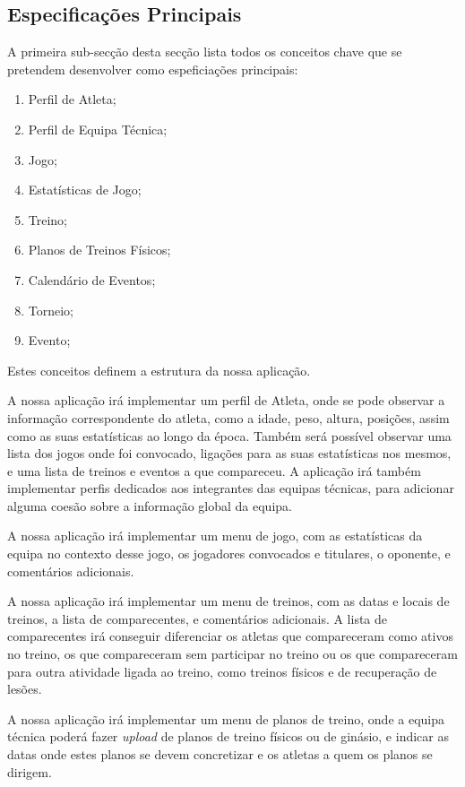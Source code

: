 \subsection{Especificações Principais} \label{sec221}
A primeira sub-secção desta secção lista todos os conceitos chave que se pretendem desenvolver como espeficiações principais:
\begin{enumerate}
	\item Perfil de Atleta;
	\item Perfil de Equipa Técnica;
	\item Jogo;
	\item Estatísticas de Jogo;
	\item Treino;
	\item Planos de Treinos Físicos;
	\item Calendário de Eventos;
	\item Torneio;
	\item Evento;
\end{enumerate}

Estes conceitos definem a estrutura da nossa aplicação. 

A nossa aplicação irá implementar um perfil de Atleta, onde se pode observar a informação correspondente do atleta, como a idade, peso, altura, posições, assim como as suas estatísticas ao longo da época. Também será possível observar uma lista dos jogos onde foi convocado, ligações para as suas estatísticas nos mesmos, e uma lista de treinos e eventos a que compareceu. A aplicação irá também implementar perfis dedicados aos integrantes das equipas técnicas, para adicionar alguma coesão sobre a informação global da equipa.

A nossa aplicação irá implementar um menu de jogo, com as estatísticas da equipa no contexto desse jogo, os jogadores convocados e titulares, o oponente, e comentários adicionais.

A nossa aplicação irá implementar um menu de treinos, com as datas e locais de treinos, a lista de comparecentes, e comentários adicionais. A lista de comparecentes irá conseguir diferenciar os atletas que compareceram como ativos no treino, os que compareceram sem participar no treino ou os que compareceram para outra atividade ligada ao treino, como treinos físicos e de recuperação de lesões.

A nossa aplicação irá implementar um menu de planos de treino, onde a equipa técnica poderá fazer \emph{upload} de planos de treino físicos ou de ginásio, e indicar as datas onde estes planos se devem concretizar e os atletas a quem os planos se dirigem.

